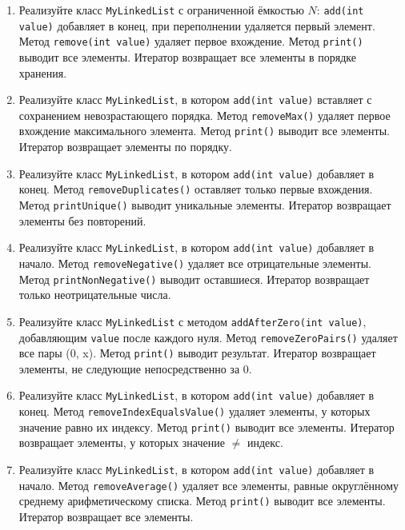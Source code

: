 \documentclass[12pt]{article}
\begin{document}
\begin{enumerate}
\item Реализуйте класс \texttt{MyLinkedList} с ограниченной ёмкостью $N$: \texttt{add(int value)} добавляет в конец, при переполнении удаляется первый элемент. Метод \texttt{remove(int value)} удаляет первое вхождение. Метод \texttt{print()} выводит все элементы. Итератор возвращает все элементы в порядке хранения.

\item Реализуйте класс \texttt{MyLinkedList}, в котором \texttt{add(int value)} вставляет с сохранением невозрастающего порядка. Метод \texttt{removeMax()} удаляет первое вхождение максимального элемента. Метод \texttt{print()} выводит все элементы. Итератор возвращает элементы по порядку.

\item Реализуйте класс \texttt{MyLinkedList}, в котором \texttt{add(int value)} добавляет в конец. Метод \texttt{removeDuplicates()} оставляет только первые вхождения. Метод \texttt{printUnique()} выводит уникальные элементы. Итератор возвращает элементы без повторений.

\item Реализуйте класс \texttt{MyLinkedList}, в котором \texttt{add(int value)} добавляет в начало. Метод \texttt{removeNegative()} удаляет все отрицательные элементы. Метод \texttt{printNonNegative()} выводит оставшиеся. Итератор возвращает только неотрицательные числа.

\item Реализуйте класс \texttt{MyLinkedList} с методом \texttt{addAfterZero(int value)}, добавляющим \texttt{value} после каждого нуля. Метод \texttt{removeZeroPairs()} удаляет все пары (0, x). Метод \texttt{print()} выводит результат. Итератор возвращает элементы, не следующие непосредственно за 0.

\item Реализуйте класс \texttt{MyLinkedList}, в котором \texttt{add(int value)} добавляет в конец. Метод \texttt{removeIndexEqualsValue()} удаляет элементы, у которых значение равно их индексу. Метод \texttt{print()} выводит все элементы. Итератор возвращает элементы, у которых значение $\neq$ индекс.

\item Реализуйте класс \texttt{MyLinkedList}, в котором \texttt{add(int value)} добавляет в начало. Метод \texttt{removeAverage()} удаляет все элементы, равные округлённому среднему арифметическому списка. Метод \texttt{print()} выводит все элементы. Итератор возвращает все элементы.


\end{enumerate}
\end{document}
